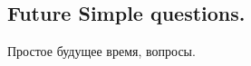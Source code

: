 \subsection{Future Simple questions.}
Простое будущее время, вопросы.
\subsection*{}
\begin{verbatim}

\end{verbatim}

\subsection*{}
\begin{verbatim}

\end{verbatim}

\subsection*{}
\begin{verbatim}

\end{verbatim}

\subsection*{}
\begin{verbatim}

\end{verbatim}